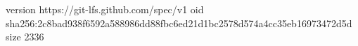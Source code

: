 version https://git-lfs.github.com/spec/v1
oid sha256:2c8bad938f6592a588986dd88fbc6ed21d1bc2578d574a4cc35eb16973472d5d
size 2336
